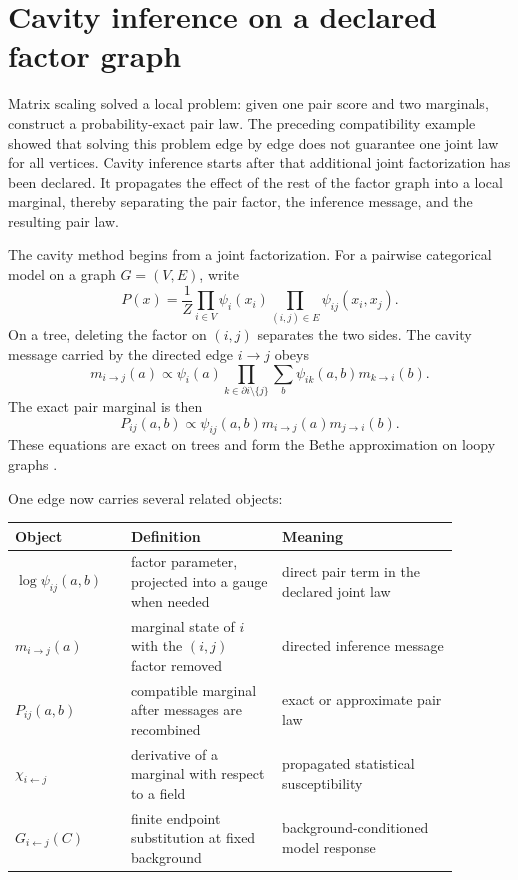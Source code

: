 \section{Cavity inference on a declared factor graph}

Matrix scaling solved a local problem: given one pair score and two marginals, construct a
probability-exact pair law.  The preceding compatibility example showed that solving this problem
edge by edge does not guarantee one joint law for all vertices.  Cavity inference starts after that
additional joint factorization has been declared.  It propagates the effect of the rest of the
factor graph into a local marginal, thereby separating the pair factor, the inference message, and
the resulting pair law.

The cavity method begins from a joint factorization.  For a pairwise categorical model on a graph
$G=(V,E)$, write
\begin{equation}
P(x)=\frac1Z\prod_{i\in V}\psi_i(x_i)
\prod_{(i,j)\in E}\psi_{ij}(x_i,x_j).
\label{eq:book-pair-factor-law}
\end{equation}
On a tree, deleting the factor on $(i,j)$ separates the two sides.  The cavity message carried by
the directed edge $i\to j$ obeys
\begin{equation}
m_{i\to j}(a)
\propto
\psi_i(a)
\prod_{k\in\partial i\setminus\{j\}}
\sum_b\psi_{ik}(a,b)m_{k\to i}(b).
\label{eq:book-cavity-message}
\end{equation}
The exact pair marginal is then
\begin{equation}
P_{ij}(a,b)
\propto
\psi_{ij}(a,b)m_{i\to j}(a)m_{j\to i}(b).
\label{eq:book-cavity-pair-marginal}
\end{equation}
These equations are exact on trees and form the Bethe approximation on loopy graphs
\cite{mezard1987,mezardmontanari2009}.

One edge now carries several related objects:
\begin{center}
\small
\begin{tabular}{@{}>{\raggedright\arraybackslash}p{0.23\linewidth}
                >{\raggedright\arraybackslash}p{0.30\linewidth}
                >{\raggedright\arraybackslash}p{0.35\linewidth}@{}}
\toprule
Object & Definition & Meaning \\
\midrule
$\log\psi_{ij}(a,b)$ & factor parameter, projected into a gauge when needed & direct pair term in the declared joint law \\
$m_{i\to j}(a)$ & marginal state of $i$ with the $(i,j)$ factor removed & directed inference message \\
$P_{ij}(a,b)$ & compatible marginal after messages are recombined & exact or approximate pair law \\
$\chi_{i\leftarrow j}$ & derivative of a marginal with respect to a field & propagated statistical susceptibility \\
$G_{i\leftarrow j}(C)$ & finite endpoint substitution at fixed background & background-conditioned model response \\
\bottomrule
\end{tabular}
\end{center}

